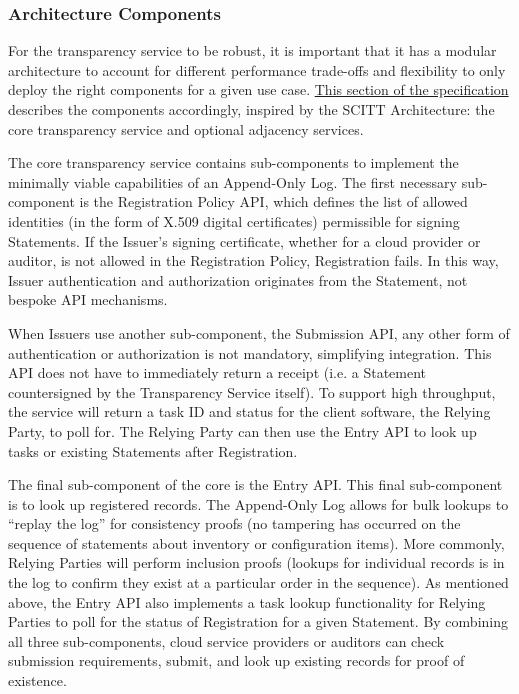 \documentclass{jdf}
\begin{document}
\subsubsection{Architecture Components}

For the transparency service to be robust, it is important that it has a modular architecture to account for different performance trade-offs and flexibility to only deploy the right components for a given use case. \href{https://aj-stein.github.io/conmotion/architecture.html#components}{This section of the specification} describes the components accordingly, inspired by the SCITT Architecture: the core transparency service and optional adjacency services.

The core transparency service contains sub-components to implement the minimally viable capabilities of an Append-Only Log. The first necessary sub-component is the Registration Policy API, which defines the list of allowed identities (in the form of X.509 digital certificates) permissible for signing Statements. If the Issuer's signing certificate, whether for a cloud provider or auditor, is not allowed in the Registration Policy, Registration fails. In this way, Issuer authentication and authorization originates from the Statement, not bespoke API mechanisms.

When Issuers use another sub-component, the Submission API, any other form of authentication or authorization is not mandatory, simplifying integration. This API does not have to immediately return a receipt (i.e. a Statement countersigned by the Transparency Service itself). To support high throughput, the service will return a task ID and status for the client software, the Relying Party, to poll for. The Relying Party can then use the Entry API to look up tasks or existing Statements after Registration. 

The final sub-component of the core is the Entry API. This final sub-component is to look up registered records. The Append-Only Log allows for bulk lookups to ``replay the log'' for consistency proofs (no tampering has occurred on the sequence of statements about inventory or configuration items). More commonly, Relying Parties will perform inclusion proofs (lookups for individual records is in the log to confirm they exist at a particular order in the sequence). As mentioned above, the Entry API also implements a task lookup functionality for Relying Parties to poll for the status of Registration for a given Statement. By combining all three sub-components, cloud service providers or auditors can check submission requirements, submit, and look up existing records for proof of existence.
\end{document}

